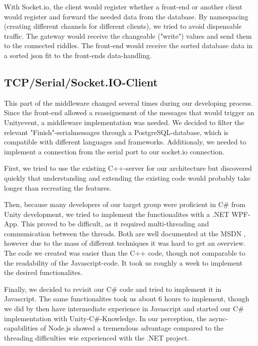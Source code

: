 With Socket.io, the client would register whether a front-end or another client would register and forward the needed data from the database. 
By namespacing (creating different channels for different clients), we tried to avoid dispensable traffic.
The gateway would receive the changeable ("write") values and send them to the connected riddles.
The front-end would receive the sorted database data in a sorted json fit to the front-ends data-handling.

\subsection{TCP/Serial/Socket.IO-Client}
This part of the middleware changed several times during our developing process. 
Since the front-end allowed a reassignement of the messages that would trigger an Unityevent, a middleware implementation was needed.
We decided to filter the relevant "Finish"-serialmessages through a PostgreSQL-database, which is compatible with different languages and frameworks.
Additionaly, we needed to implement a connection from the serial port to our socket.io connection.

First, we tried to use the existing C++-server for our architecture but discovered quickly that understanding and extending the existing code would probably take longer than recreating the features.

Then, because many developers of our target group were proficient in C\# from Unity development, we tried to implement the functionalites with a .NET WPF-App.
This proved to be difficult, as it required multi-threading and communication between the threads. Both are well documented at the MSDN \parencite{MSDN}, 
however due to the mass of different techniques it was hard to get an overview. 
The code we created was easier than the C++ code, though not comparable to the readability of the Javascript-code.
It took us roughly a week to implement the desired functionalites. 

Finally, we decided to revisit our C\# code and tried to implement it in Javascript.
The same functionalites took us about 6 hours to implement, though we did by then have intermediate experience in Javascript and started our C\# implementation with Unity-C\#-Knowledge.
In our perception, the async-capabilities of Node.js showed a tremendous advantage compared to the threading difficulties wie experienced with the .NET project.

